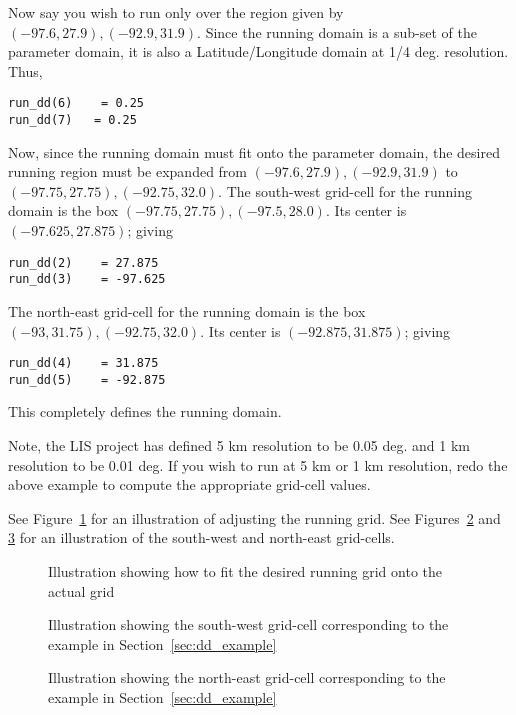 Now say you wish to run only over the region given by 
$(-97.6,27.9), (-92.9,31.9)$.  Since the running domain is a sub-set of the
parameter domain, it is also a Latitude/Longitude domain at 1/4 deg.
resolution.  Thus,
\begin{verbatim}
run_dd(6)    = 0.25
run_dd(7)   = 0.25
\end{verbatim}

Now, since the running domain must fit onto the parameter domain, the desired
running region must be expanded from $(-97.6,27.9), (-92.9,31.9)$
to $(-97.75,27.75), (-92.75,32.0)$.  The south-west grid-cell for the running
domain is the box $(-97.75,27.75), (-97.5,28.0)$.  
Its center is $(-97.625,27.875)$; giving
\begin{verbatim}
run_dd(2)    = 27.875
run_dd(3)    = -97.625
\end{verbatim}

The north-east grid-cell for the running domain is the box
$(-93,31.75), (-92.75,32.0)$.  Its center is $(-92.875,31.875)$; giving
\begin{verbatim}
run_dd(4)    = 31.875
run_dd(5)    = -92.875
\end{verbatim}

This completely defines the running domain.

Note, the LIS project has defined 5 km resolution to be 0.05 deg. and
1 km resolution to be 0.01 deg.  If you wish to run at 5 km or 1 km
resolution, redo the above example to compute the appropriate grid-cell 
values.

See Figure~\ref{fig:snap_to_grid} for an illustration of adjusting the running 
grid.  See Figures~\ref{fig:south-west} and \ref{fig:north-east} for an
illustration of the south-west and north-east grid-cells.

\begin{figure}
\caption{Illustration showing how to fit the desired running grid onto the actual grid} \label{fig:snap_to_grid}
\end{figure}

\begin{figure}
\caption{Illustration showing the south-west grid-cell corresponding to 
the example in Section~\ref{sec:dd_example}} \label{fig:south-west}
\end{figure}

\begin{figure}
\caption{Illustration showing the north-east grid-cell corresponding to 
the example in Section~\ref{sec:dd_example}} \label{fig:north-east}
\end{figure}

